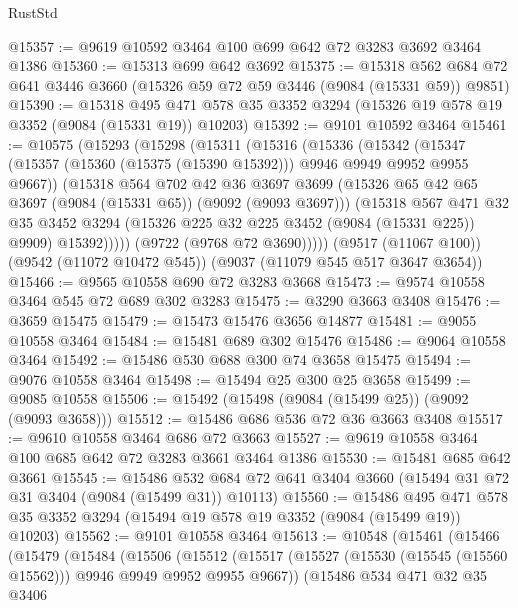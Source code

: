 \begin{lexlean}{RustStd}
\begin{coremodule}
@15357 := @9619 @10592 @3464 @100 @699 @642 @72 @3283 @3692 @3464 @1386
@15360 := @15313 @699 @642 @3692
@15375 := @15318
    @562
    @684
    @72
    @641
    @3446
    @3660
    (@15326 @59 @72 @59 @3446 (@9084 (@15331 @59)) @9851)
@15390 := @15318
    @495
    @471
    @578
    @35
    @3352
    @3294
    (@15326 @19 @578 @19 @3352 (@9084 (@15331 @19)) @10203)
@15392 := @9101 @10592 @3464
@15461 := @10575
    (@15293
      (@15298
        (@15311
          (@15316
            (@15336
              (@15342
                (@15347 (@15357 (@15360 (@15375 (@15390 @15392))) @9946 @9949 @9952 @9955 @9667))
                (@15318
                  @564
                  @702
                  @42
                  @36
                  @3697
                  @3699
                  (@15326 @65 @42 @65 @3697 (@9084 (@15331 @65)) (@9092 (@9093 @3697)))
                  (@15318
                    @567
                    @471
                    @32
                    @35
                    @3452
                    @3294
                    (@15326 @225 @32 @225 @3452 (@9084 (@15331 @225)) @9909)
                    @15392)))))
          (@9722 (@9768 @72 @3690)))))
    (@9517 (@11067 @100))
    (@9542 (@11072 @10472 @545))
    (@9037 (@11079 @545 @517 @3647 @3654))
@15466 := @9565 @10558 @690 @72 @3283 @3668
@15473 := @9574 @10558 @3464 @545 @72 @689 @302 @3283
@15475 := @3290 @3663 @3408
@15476 := @3659 @15475
@15479 := @15473 @15476 @3656 @14877
@15481 := @9055 @10558 @3464
@15484 := @15481 @689 @302 @15476
@15486 := @9064 @10558 @3464
@15492 := @15486 @530 @688 @300 @74 @3658 @15475
@15494 := @9076 @10558 @3464
@15498 := @15494 @25 @300 @25 @3658
@15499 := @9085 @10558
@15506 := @15492 (@15498 (@9084 (@15499 @25)) (@9092 (@9093 @3658)))
@15512 := @15486 @686 @536 @72 @36 @3663 @3408
@15517 := @9610 @10558 @3464 @686 @72 @3663
@15527 := @9619 @10558 @3464 @100 @685 @642 @72 @3283 @3661 @3464 @1386
@15530 := @15481 @685 @642 @3661
@15545 := @15486
    @532
    @684
    @72
    @641
    @3404
    @3660
    (@15494 @31 @72 @31 @3404 (@9084 (@15499 @31)) @10113)
@15560 := @15486
    @495
    @471
    @578
    @35
    @3352
    @3294
    (@15494 @19 @578 @19 @3352 (@9084 (@15499 @19)) @10203)
@15562 := @9101 @10558 @3464
@15613 := @10548
    (@15461
      (@15466
        (@15479
          (@15484
            (@15506
              (@15512
                (@15517 (@15527 (@15530 (@15545 (@15560 @15562))) @9946 @9949 @9952 @9955 @9667))
                (@15486
                  @534
                  @471
                  @32
                  @35
                  @3406

\end{coremodule}
\end{lexlean}
